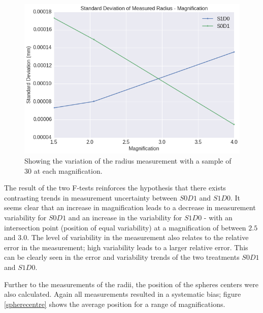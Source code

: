 \documentclass[
  twoside,
  11pt, a4paper,
  footinclude=true,
  headinclude=true,
  cleardoublepage=empty
]{scrbook}
\begin{document}
\begin{figure}[h!]
  \centering
    \includegraphics[width=\textwidth]{figures/output_34_0.png}
    \caption{Showing the variation of the radius measurement with a sample of 30 at each magnification.}
        \label{stdmeasuredradiusxsamples}
\end{figure}

The result of the two F-tests reinforces the hypothesis that there exists contrasting trends in measurement uncertainty between $S0D1$ and $S1D0$. It seems clear that an increase in magnification leads to a decrease in measurement variability for $S0D1$ and an increase in the variability for $S1D0$ - with an intersection point (position of equal variability) at a magnification of between $2.5$ and $3.0$. The level of variability in the measurement also relates to the relative error in the measurement; high variability leads to a larger relative error. This can be clearly seen in the error and variability trends of the two treatments $S0D1$ and $S1D0$.

Further to the measurements of the radii, the position of the spheres centers were also calculated. Again all measurements resulted in a systematic bias; figure \ref{spherecentre} shows the average position for a range of magnifications.
\end{document}
